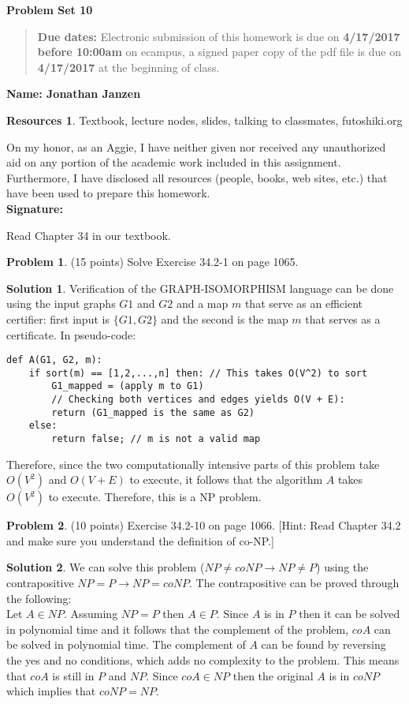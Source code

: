 \documentclass{article}
\theoremstyle{definition}
\newtheorem{problem}{Problem}
\newtheorem*{solution}{Solution}
\newtheorem*{resources}{Resources}
\newcommand{\name}[1]{\noindent\textbf{Name: #1}}
\newcommand{\honor}{\noindent On my honor, as an Aggie, I have neither
  given nor received any unauthorized aid on any portion of the
  academic work included in this assignment. Furthermore, I have
  disclosed all resources (people, books, web sites, etc.) that have
  been used to prepare this homework. \\[1ex]
 \textbf{Signature:} \underline{\hspace*{5cm}} }
\newcommand{\problemset}[1]{\begin{center}\textbf{Problem Set #1}\end{center}}
\newcommand{\duedate}[2]{\begin{quote}\textbf{Due dates:} Electronic
    submission of this homework is due on \textbf{#1} on ecampus, a
    signed paper copy of the pdf file is due on \textbf{#2} at the
    beginning of class. \end{quote} }
\begin{document}
\problemset{10}
\duedate{4/17/2017 before 10:00am}{4/17/2017}
\name{Jonathan Janzen}
\begin{resources} Textbook, lecture nodes, slides, talking to classmates, futoshiki.org
\end{resources}
\honor

\newpage

Read Chapter 34 in our textbook. 

\begin{problem} (15 points) %
Solve Exercise 34.2-1 on page 1065. 
\end{problem}
\begin{solution}
Verification of the GRAPH-ISOMORPHISM language can be done using the input graphs $G1$  and $G2$ and a map $m$ that serve as an efficient certifier: first input is $\{G1, G2\}$ and the second is the map $m$ that serves as a certificate.
In pseudo-code:
\begin{verbatim}
def A(G1, G2, m):
    if sort(m) == [1,2,...,n] then: // This takes O(V^2) to sort
        G1_mapped = (apply m to G1)
        // Checking both vertices and edges yields O(V + E):
        return (G1_mapped is the same as G2)
    else:
        return false; // m is not a valid map
\end{verbatim}
Therefore, since the two computationally intensive parts of this problem take $O(V^2)$ and $O(V+E)$ to execute, it follows that the algorithm $A$ takes $O(V^2)$ to execute. Therefore, this is a NP problem.
\end{solution}

\begin{problem} (10 points) %
Exercise 34.2-10 on page 1066. [Hint: Read Chapter 34.2 and make sure you
understand the definition of co-NP.]
\end{problem}
\begin{solution}
We can solve this problem ($NP \neq coNP \rightarrow NP \neq P$) using the contrapositive $NP = P \rightarrow NP = coNP $.
The contrapositive can be proved through the following:\\
Let $A \in NP$. Assuming $NP=P$ then $A \in P$. Since $A$ is in $P$ then it can be solved in polynomial time and it follows that the complement of the problem, $coA$ can be solved in polynomial time. The complement of $A$ can be found by reversing the yes and no conditions, which adds no complexity to the problem. This means that $coA$ is still in $P$ and $NP$. Since $coA \in NP$ then the original $A$ is in $coNP$ which implies that $coNP = NP$.
\end{solution}
\end{document}
